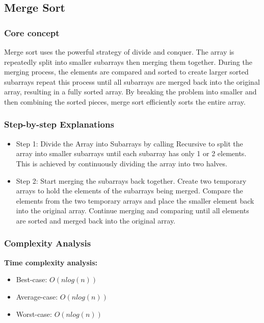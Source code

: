 \subsection{Merge Sort}

\subsubsection{Core concept}
Merge sort uses the powerful strategy of divide and conquer. The array is repeatedly split into smaller subarrays then merging them together. During the merging process, the elements are compared and sorted to create larger sorted subarrays repeat this process until all subarrays are merged back into the original array, resulting in a fully sorted array. By breaking the problem into smaller and then combining the sorted pieces, merge sort efficiently sorts the entire array.

\vspace{3pt}

\subsubsection{Step-by-step Explanations}
\begin{itemize}[label=-]
    \item Step 1: Divide the Array into Subarrays by calling Recursive to split the array into smaller subarrays until each subarray has only 1 or 2 elements. This is achieved by continuously dividing the array into two halves.
    \item Step 2: Start merging the subarrays back together. Create two temporary arrays to hold the elements of the subarrays being merged. Compare the elements from the two temporary arrays and place the smaller element back into the original array. Continue merging and comparing until all elements are sorted and merged back into the original array.
\end{itemize}

\subsubsection{Complexity Analysis}
\textbf{Time complexity analysis: }
\begin{itemize}
    \item Best-case: $O(nlog(n))$
    \item Average-case: $O(nlog(n))$
    \item Worst-case: $O(nlog(n))$
\end{itemize}

